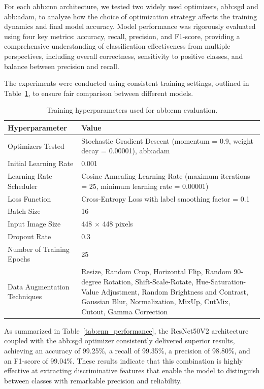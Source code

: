 For each \gls{abb:cnn} architecture, we tested two widely used optimizers, \gls{abb:sgd} and \gls{abb:adam}, to analyze how the choice of optimization strategy affects the training dynamics and final model accuracy. Model performance was rigorously evaluated using four key metrics: accuracy, recall, precision, and F1-score, providing a comprehensive understanding of classification effectiveness from multiple perspectives, including overall correctness, sensitivity to positive classes, and balance between precision and recall.

The experiments were conducted using consistent training settings, outlined in Table~\ref{tab:hyperparameters}, to ensure fair comparison between different models.

\begin{table}[H]
    \centering
    \caption{Training hyperparameters used for \gls{abb:cnn} evaluation.}
    \label{tab:hyperparameters}
    \renewcommand{\arraystretch}{1.4}
    \begin{tabular}{|p{5.5cm}|p{8cm}|}
        \hline
        \textbf{Hyperparameter} & \textbf{Value} \\ \hline
        Optimizers Tested & Stochastic Gradient Descent (momentum = 0.9, weight decay = 0.00001), \gls{abb:adam} \\ \hline
        Initial Learning Rate & 0.001 \\ \hline
        Learning Rate Scheduler & Cosine Annealing Learning Rate (maximum iterations = 25, minimum learning rate = 0.00001) \\ \hline
        Loss Function & Cross-Entropy Loss with label smoothing factor = 0.1 \\ \hline
        Batch Size & 16 \\ \hline
        Input Image Size & 448 $\times$ 448 pixels \\ \hline
        Dropout Rate & 0.3 \\ \hline
        Number of Training Epochs & 25 \\ \hline
        Data Augmentation Techniques & Resize, Random Crop, Horizontal Flip, Random 90-degree Rotation, Shift-Scale-Rotate, Hue-Saturation-Value Adjustment, Random Brightness and Contrast, Gaussian Blur, Normalization, MixUp, CutMix, Cutout, Gamma Correction \\ \hline
    \end{tabular}
\end{table}

As summarized in Table~\ref{tab:cnn_performance}, the ResNet50V2 architecture coupled with the \gls{abb:sgd} optimizer consistently delivered superior results, achieving an accuracy of 99.25\%, a recall of 99.35\%, a precision of 98.80\%, and an F1-score of 99.04\%. These results indicate that this combination is highly effective at extracting discriminative features that enable the model to distinguish between classes with remarkable precision and reliability.

